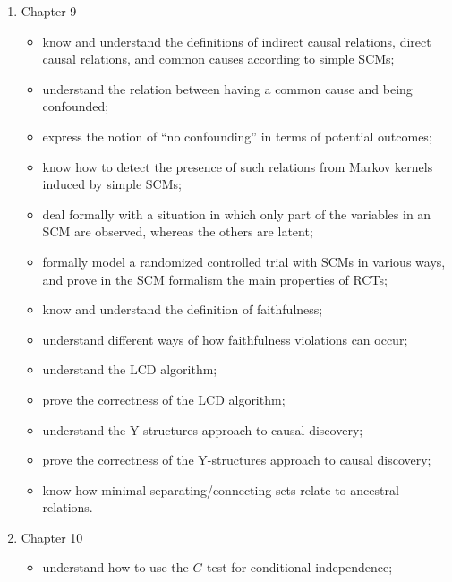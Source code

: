 \begin{enumerate}
\begin{itemize}
      \item construct a twin graph;
      \item know and understand the basic commutation and compatibility properties of twinning with other basic operations on and properties of SCMs;
      \item be able to reason about counterfactuals by using the twin SCM;
      \item be aware of the empirical limitations of working with counterfactuals.
    \end{itemize}
  \item Chapter 9
    \begin{itemize}
      \item know and understand the definitions of indirect causal relations, direct causal relations, and common causes according to simple SCMs;
      \item understand the relation between having a common cause and being confounded;
      \item express the notion of ``no confounding'' in terms of potential outcomes;
      \item know how to detect the presence of such relations from Markov kernels induced by simple SCMs;
      \item deal formally with a situation in which only part of the variables in an SCM are observed, whereas the others are latent;
      \item formally model a randomized controlled trial with SCMs in various ways, and prove in the SCM formalism the main properties of RCTs;
      \item know and understand the definition of faithfulness;
      \item understand different ways of how faithfulness violations can occur;
      \item understand the LCD algorithm;
      \item prove the correctness of the LCD algorithm;
      \item understand the Y-structures approach to causal discovery;
      \item prove the correctness of the Y-structures approach to causal discovery;
      \item know how minimal separating/connecting sets relate to ancestral relations.
    \end{itemize}
  \item Chapter 10
    \begin{itemize}
      \item understand how to use the $G$ test for conditional independence;

\end{itemize}
\end{enumerate}

